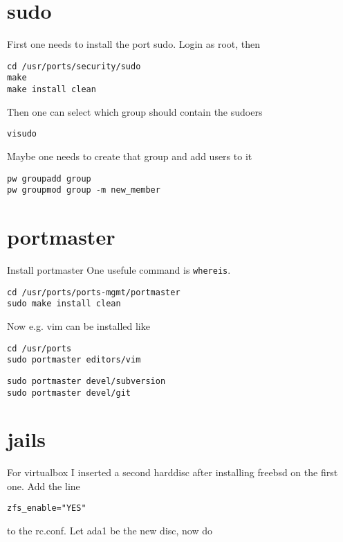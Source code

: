 \documentclass[a4paper]{article}
\begin{document}
\section{sudo}

First one needs to install the port sudo. Login as root, then

\begin{verbatim}
cd /usr/ports/security/sudo
make
make install clean
\end{verbatim}

Then one can select which group should contain the sudoers

\begin{verbatim}
visudo
\end{verbatim}

Maybe one needs to create that group and add users to it

\begin{verbatim}
pw groupadd group
pw groupmod group -m new_member
\end{verbatim}

\section{portmaster}
Install portmaster
One usefule command is {\tt whereis}.

\begin{verbatim}
cd /usr/ports/ports-mgmt/portmaster
sudo make install clean
\end{verbatim}

Now e.g. vim can be installed like

\begin{verbatim}
cd /usr/ports
sudo portmaster editors/vim
\end{verbatim}

\begin{verbatim}
sudo portmaster devel/subversion
sudo portmaster devel/git
\end{verbatim}

\section{jails}
For virtualbox I inserted a second harddisc after installing freebsd on the first one.
Add the line

\begin{verbatim}
zfs_enable="YES"
\end{verbatim}

to the rc.conf.
Let ada1 be the new disc, now do
\end{document}

